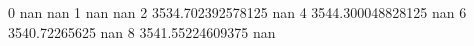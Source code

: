 0 nan nan
1 nan nan
2 3534.702392578125 nan
4 3544.300048828125 nan
6 3540.72265625 nan
8 3541.55224609375 nan
